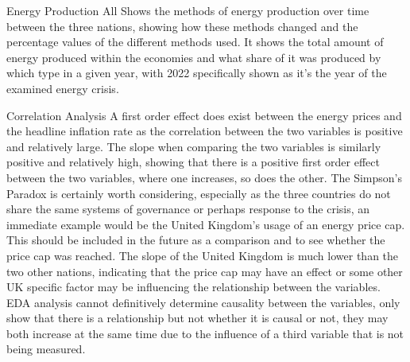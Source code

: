 Energy Production All
Shows the methods of energy production over time between the three nations, showing how these methods changed and the percentage values of the different methods used.
It shows the total amount of energy produced within the economies and what share of it was produced by which type in a given year, with 2022 specifically shown as it's the year of the examined energy crisis.

Correlation Analysis
A first order effect does exist between the energy prices and the headline inflation rate as the correlation between the two variables is positive and relatively large.
The slope when comparing the two variables is similarly positive and relatively high, showing that there is a positive first order effect between the two variables, where one increases, so does the other.
The Simpson's Paradox is certainly worth considering, especially as the three countries do not share the same systems of governance or perhaps response to the crisis, an immediate example would be the United Kingdom's usage of an energy price cap. This should be included in the future as a comparison and to see whether the price cap was reached.
The slope of the United Kingdom is much lower than the two other nations, indicating that the price cap may have an effect or some other UK specific factor may be influencing the relationship between the variables.
EDA analysis cannot definitively determine causality between the variables, only show that there is a relationship but not whether it is causal or not, they may both increase at the same time due to the influence of a third variable that is not being measured.
